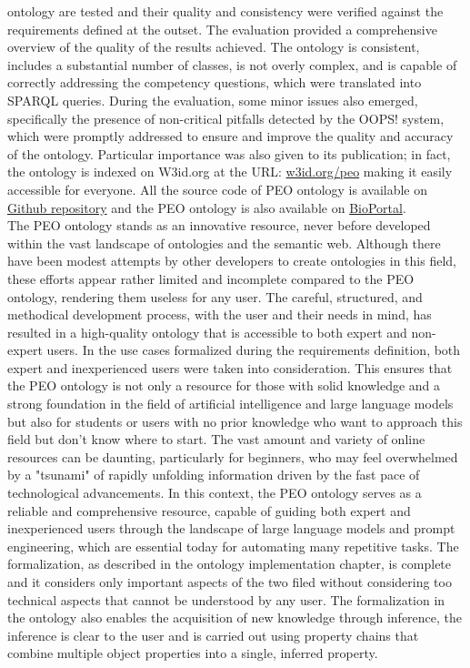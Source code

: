 ontology are tested and their quality and consistency were verified against the requirements defined at the outset. The evaluation provided a comprehensive overview of the quality of the results achieved. The ontology is consistent, includes a substantial number of classes, is not overly complex, and is capable of correctly addressing the competency questions, which were translated into SPARQL queries. During the evaluation, some minor issues also emerged, specifically the presence of non-critical pitfalls detected by the OOPS! system, which were promptly addressed to ensure and improve the quality and accuracy of the ontology. Particular importance was also given to its publication; in fact, the ontology is indexed on W3id.org at the URL: \href{https://w3id.org/peo}{w3id.org/peo} making it easily accessible for everyone. All the source code of PEO ontology is available on \href{https://github.com/simonegramegna/peo}{Github repository} and the PEO ontology is also available on \href{https://bioportal.bioontology.org/ontologies/PEO_ONTOLOGY}{BioPortal}.\\
The PEO ontology stands as an innovative resource, never before developed within the vast landscape of ontologies and the semantic web. Although there have been modest attempts by other developers to create ontologies in this field, these efforts appear rather limited and incomplete compared to the PEO ontology, rendering them useless for any user. The careful, structured, and methodical development process, with the user and their needs in mind, has resulted in a high-quality ontology that is accessible to both expert and non-expert users. In the use cases formalized during the requirements definition, both expert and inexperienced users were taken into consideration. This ensures that the PEO ontology is not only a resource for those with solid knowledge and a strong foundation in the field of artificial intelligence and large language models but also for students or users with no prior knowledge who want to approach this field but don’t know where to start. The vast amount and variety of online resources can be daunting, particularly for beginners, who may feel overwhelmed by a "tsunami" of rapidly unfolding information driven by the fast pace of technological advancements. In this context, the PEO ontology serves as a reliable and comprehensive resource, capable of guiding both expert and inexperienced users through the landscape of large language models and prompt engineering, which are essential today for automating many repetitive tasks. The formalization, as described in the ontology implementation chapter, is complete and it considers only important aspects of the two filed without considering too technical aspects that cannot be understood by any user. The formalization in the ontology also enables the acquisition of new knowledge through inference, the inference is clear to the user and is carried out using property chains that combine multiple object properties into a single, inferred property.

